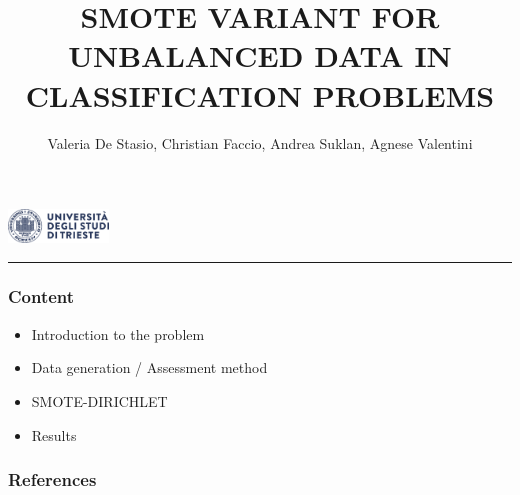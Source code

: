 \documentclass{beamer}
\title[SMOTE-DIRICHLET]{\LARGE SMOTE VARIANT FOR UNBALANCED DATA IN CLASSIFICATION PROBLEMS}
\author[De Stasio, Faccio, Suklan, Valentini]{\small Valeria De Stasio, Christian Faccio, Andrea Suklan, Agnese Valentini}
\begin{document}
\begin{frame}
  \centering
  \includegraphics[width=0.2\textwidth]{figures/logo.png} \\
  \rule{0.5\linewidth}{0.3pt}
  \titlepage
\end{frame}

\begin{frame}
  \frametitle{Content}
  \begin{itemize}
    \item Introduction to the problem
    \item Data generation / Assessment method 
    \item SMOTE-DIRICHLET
    \item Results
  \end{itemize}
\end{frame}

\begin{frame}
  \frametitle{References}
  \nocite{*}
  \printbibliography
\end{frame}
\end{document}

